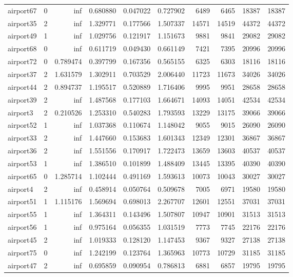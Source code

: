 \begin{longtable}{|l|r|r|r|r|r|r|r|r|r|}
airport67 & 0 & inf & 0.680880 & 0.047022 & 0.727902 & 6489 & 6465 & 18387 & 18387 \\
airport35 & 2 & inf & 1.329771 & 0.177566 & 1.507337 & 14571 & 14519 & 44372 & 44372 \\
airport49 & 1 & inf & 1.029756 & 0.121917 & 1.151673 & 9881 & 9841 & 29082 & 29082 \\
airport68 & 0 & inf & 0.611719 & 0.049430 & 0.661149 & 7421 & 7395 & 20996 & 20996 \\
airport72 & 0 & 0.789474 & 0.397799 & 0.167356 & 0.565155 & 6325 & 6303 & 18116 & 18116 \\
airport37 & 2 & 1.631579 & 1.302911 & 0.703529 & 2.006440 & 11723 & 11673 & 34026 & 34026 \\
airport44 & 2 & 0.894737 & 1.195517 & 0.520889 & 1.716406 & 9995 & 9951 & 28658 & 28658 \\
airport39 & 2 & inf & 1.487568 & 0.177103 & 1.664671 & 14093 & 14051 & 42534 & 42534 \\
airport3 & 2 & 0.210526 & 1.253310 & 0.540283 & 1.793593 & 13229 & 13175 & 39066 & 39066 \\
airport52 & 1 & inf & 1.037368 & 0.110674 & 1.148042 & 9055 & 9015 & 26090 & 26090 \\
airport33 & 2 & inf & 1.447660 & 0.153683 & 1.601343 & 12349 & 12301 & 36867 & 36867 \\
airport36 & 2 & inf & 1.551556 & 0.170917 & 1.722473 & 13659 & 13603 & 40537 & 40537 \\
airport53 & 1 & inf & 1.386510 & 0.101899 & 1.488409 & 13445 & 13395 & 40390 & 40390 \\
airport65 & 0 & 1.285714 & 1.102444 & 0.491169 & 1.593613 & 10073 & 10043 & 30027 & 30027 \\
airport4 & 2 & inf & 0.458914 & 0.050764 & 0.509678 & 7005 & 6971 & 19580 & 19580 \\
airport51 & 1 & 1.115176 & 1.569694 & 0.698013 & 2.267707 & 12601 & 12551 & 37031 & 37031 \\
airport55 & 1 & inf & 1.364311 & 0.143496 & 1.507807 & 10947 & 10901 & 31513 & 31513 \\
airport56 & 1 & inf & 0.975164 & 0.056355 & 1.031519 & 7773 & 7745 & 22176 & 22176 \\
airport45 & 2 & inf & 1.019333 & 0.128120 & 1.147453 & 9367 & 9327 & 27138 & 27138 \\
airport75 & 0 & inf & 1.242199 & 0.123764 & 1.365963 & 10773 & 10729 & 31185 & 31185 \\
airport47 & 2 & inf & 0.695859 & 0.090954 & 0.786813 & 6881 & 6857 & 19795 & 19795 \\

\end{longtable}
